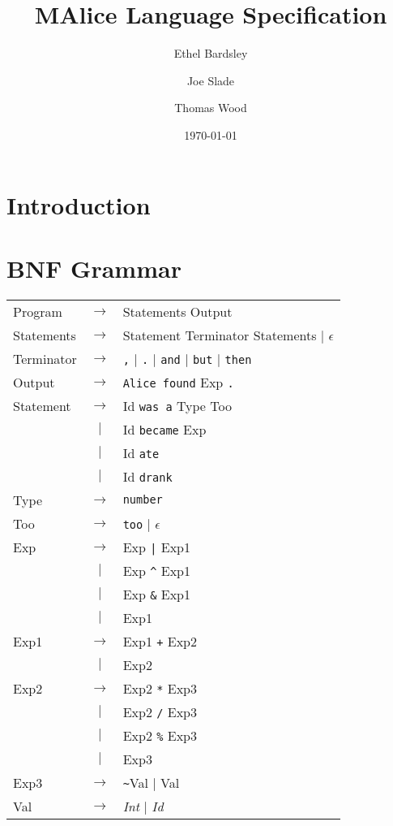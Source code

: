 \documentclass[a4wide, 11pt]{article}
\begin{document}
\title{MAlice Language Specification}

\author{Ethel Bardsley \and Joe Slade \and Thomas Wood}

\date{\today}         %

\maketitle            %

\section{Introduction}

\section{BNF Grammar} 
\begin{tabular}{lcl}
Program     & $\to$ & Statements Output \\
Statements  & $\to$ & Statement Terminator Statements $|$ $\epsilon$ \\
Terminator  & $\to$ & \verb:,: $|$ \verb:.: $|$ \verb:and: $|$ \verb:but: $|$ \verb:then: \\
Output      & $\to$ & \verb:Alice found: Exp \verb:.: \\
Statement   & $\to$ & Id \verb|was a| Type Too \\
            &  $|$  & Id \verb|became| Exp \\
            &  $|$  & Id \verb|ate| \\
            &  $|$  & Id \verb|drank| \\
Type        & $\to$ & \verb|number| \\
Too         & $\to$ & \verb|too| $|$ $\epsilon$ \\
Exp         & $\to$ & Exp \verb:|: Exp1 \\
            &  $|$  & Exp \verb:^: Exp1 \\
            &  $|$  & Exp \verb:&: Exp1 \\
            &  $|$  & Exp1 \\
Exp1        & $\to$ & Exp1 \verb:+: Exp2 \\
            &  $|$  & Exp2 \\
Exp2        & $\to$ & Exp2 \verb:*: Exp3 \\
            &  $|$  & Exp2 \verb:/: Exp3 \\
            &  $|$  & Exp2 \verb:%: Exp3 \\
            &  $|$  & Exp3 \\
Exp3        & $\to$ & \verb:~:Val $|$ Val \\
Val         & $\to$ & \emph{Int} $|$ \emph{Id} \\
\end{tabular}
\end{document}
